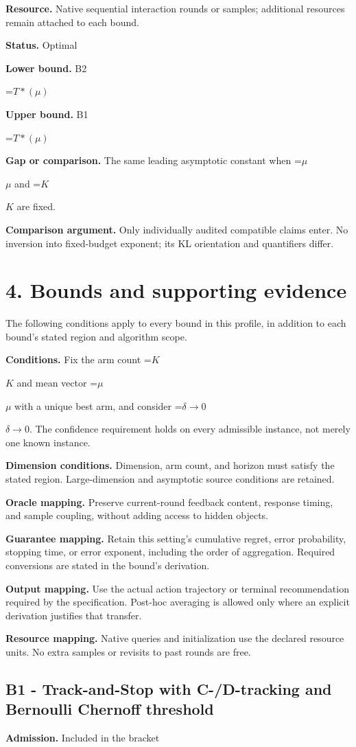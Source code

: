 \documentclass[10pt,a4paper]{article}
\newcommand{\AtlasMath}[1]{\par\begingroup\centering\setbox0=\hbox{$\displaystyle #1$}\ifdim\wd0>1.4\linewidth\typeout{ATLAS WIDE FORMULA: \the\wd0}\fi\ifdim\wd0>\linewidth\resizebox{\linewidth}{!}{\box0}\else\box0\fi\par\endgroup}
\newcommand{\AtlasInlineMath}[1]{\begingroup\setbox0=\hbox{$#1$}\ifdim\wd0>.4\linewidth\endgroup\AtlasMath{#1}\else\endgroup$#1$\fi}
\begin{document}
\textbf{Resource.} Native sequential interaction rounds or samples; additional resources remain attached to each bound.

\textbf{Status.} Optimal

\textbf{Lower bound.} B2

\AtlasMath{T*(\mu )}
\textbf{Upper bound.} B1

\AtlasMath{T*(\mu )}
\textbf{Gap or comparison.} The same leading asymptotic constant when \AtlasInlineMath{\mu} and \AtlasInlineMath{K} are fixed.

\textbf{Comparison argument.} Only individually audited compatible claims enter. No inversion into fixed-budget exponent; its KL orientation and quantifiers differ.

\section{4. Bounds and supporting evidence}
The following conditions apply to every bound in this profile, in addition to each bound's stated region and algorithm scope.

\textbf{Conditions.} Fix the arm count \AtlasInlineMath{K} and mean vector \AtlasInlineMath{\mu} with a unique best arm, and consider \AtlasInlineMath{\delta\to0}. The confidence requirement holds on every admissible instance, not merely one known instance.

\textbf{Dimension conditions.} Dimension, arm count, and horizon must satisfy the stated region. Large-dimension and asymptotic source conditions are retained.

\textbf{Oracle mapping.} Preserve current-round feedback content, response timing, and sample coupling, without adding access to hidden objects.

\textbf{Guarantee mapping.} Retain this setting's cumulative regret, error probability, stopping time, or error exponent, including the order of aggregation. Required conversions are stated in the bound's derivation.

\textbf{Output mapping.} Use the actual action trajectory or terminal recommendation required by the specification. Post-hoc averaging is allowed only where an explicit derivation justifies that transfer.

\textbf{Resource mapping.} Native queries and initialization use the declared resource units. No extra samples or revisits to past rounds are free.

\subsection{B1 - Track-and-Stop with C-/D-tracking and Bernoulli Chernoff threshold}
\textbf{Admission.} Included in the bracket
\end{document}
